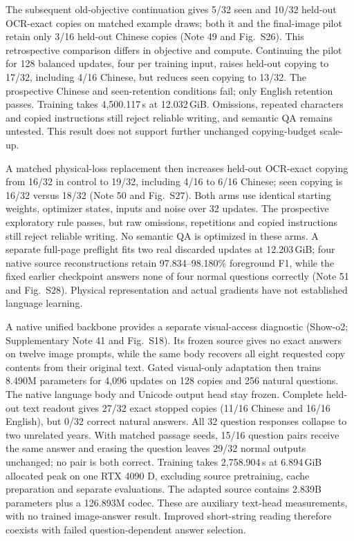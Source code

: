 The subsequent old-objective continuation gives 5/32 seen and 10/32 held-out
OCR-exact copies on matched example draws; both it and the final-image pilot
retain only 3/16 held-out Chinese copies (Note 49 and Fig.~S26). This
retrospective comparison differs in objective and compute. Continuing the
pilot for 128 balanced updates, four per training input, raises held-out
copying to 17/32, including 4/16 Chinese, but reduces seen copying to 13/32.
The prospective Chinese and seen-retention conditions fail; only English
retention passes. Training takes 4,500.117\,s at 12.032\,GiB. Omissions,
repeated characters and copied instructions still reject reliable writing, and
semantic QA remains untested. This result does not support further unchanged
copying-budget scale-up.

A matched physical-loss replacement then increases held-out OCR-exact copying
from 16/32 in control to 19/32, including 4/16 to 6/16 Chinese; seen copying
is 16/32 versus 18/32 (Note 50 and Fig.~S27). Both arms use identical starting
weights, optimizer states, inputs and noise over 32 updates. The prospective
exploratory rule passes, but raw omissions, repetitions and copied instructions
still reject reliable writing. No semantic QA is optimized in these arms.
A separate full-page preflight fits two real discarded updates at
12.203\,GiB; four native source reconstructions retain 97.834--98.180\%
foreground F1, while the fixed earlier checkpoint answers none of four normal
questions correctly (Note 51 and Fig.~S28). Physical representation and actual
gradients have not established language learning.

A native unified backbone provides a separate visual-access diagnostic
(Show-o2\cite{showo2}; Supplementary Note 41 and Fig.~S18). Its frozen source
gives no exact answers on twelve image prompts, while the same body recovers
all eight requested copy contents from their original text. Gated visual-only
adaptation then trains 8.490M parameters for 4,096 updates on 128 copies and
256 natural questions. The native language body and Unicode output head stay
frozen. Complete held-out text readout gives 27/32 exact stopped copies
(11/16 Chinese and 16/16 English), but 0/32 correct natural answers. All
32 question responses collapse to two unrelated years. With matched passage
seeds, 15/16 question pairs receive the same answer and erasing the question
leaves 29/32 normal outputs unchanged; no pair is both correct. Training takes
2,758.904\,s at 6.894\,GiB allocated peak on one RTX 4090 D, excluding source
pretraining, cache preparation and separate evaluations. The adapted source
contains 2.839B parameters plus a 126.893M codec. These are auxiliary text-head
measurements, with no trained image-answer result. Improved short-string
reading therefore coexists with failed question-dependent answer selection.


